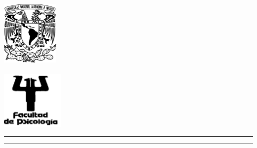 \documentclass[
12pt, %
spanish, %
onehalfspacing, %
headsepline, %
]{MastersDoctoralThesis} %
\author{Adriana Felisa Chávez De la Peña}%
\begin{document}
\frontmatter %

\pagestyle{plain} %


\begin{titlepage}

\begin{minipage}[c][9in][s]{1in}
\centering
\hspace*{-0.2in} \includegraphics[width=1.1in]{Escudo-UNAM}\\[10pt]
\hskip 2pt\vrule width 2pt height 6.7in
\hskip 1mm\vrule width 1pt height 6.7in\\[10pt]
\hspace*{-0.2in} \includegraphics[width=1.2in]{PSI}
\end{minipage}\hskip 10pt
\begin{minipage}[c][\textheight][s]{5.125in}
\centering
{\Large\scshape\univname}
\vspace{3mm}\hrule height2pt
\vspace{1mm}\hrule height1pt
\vspace{3mm}
{\scshape\facname}\par
\vfill\vfill
{\def\baselinestretch{1}\LARGE\scshape\ttitle\par}
\vfill\vfill
\\[8pt]

\end{minipage}
\end{titlepage}
\end{document}

